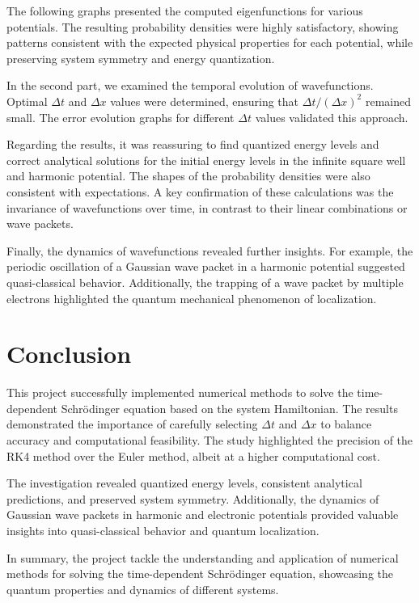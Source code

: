 \documentclass[12pt,french]{article}
\begin{document}
The following graphs presented the computed eigenfunctions for various potentials. The resulting probability densities were highly satisfactory, showing patterns consistent with the expected physical properties for each potential, while preserving system symmetry and energy quantization.

In the second part, we examined the temporal evolution of wavefunctions. Optimal \(\Delta t\) and \(\Delta x\) values were determined, ensuring that \(\Delta t / (\Delta x)^2\) remained small. The error evolution graphs for different \(\Delta t\) values validated this approach.


Regarding the results, it was reassuring to find quantized energy levels and correct analytical solutions for the initial energy levels in the infinite square well and harmonic potential. The shapes of the probability densities were also consistent with expectations. A key confirmation of these calculations was the invariance of wavefunctions over time, in contrast to their linear combinations or wave packets.

Finally, the dynamics of wavefunctions revealed further insights. For example, the periodic oscillation of a Gaussian wave packet in a harmonic potential suggested quasi-classical behavior. Additionally, the trapping of a wave packet by multiple electrons highlighted the quantum mechanical phenomenon of localization.

\section{Conclusion}

This project successfully implemented numerical methods to solve the time-dependent Schrödinger equation based on the system Hamiltonian. The results demonstrated the importance of carefully selecting \(\Delta t\) and \(\Delta x\) to balance accuracy and computational feasibility. The study highlighted the precision of the RK4 method over the Euler method, albeit at a higher computational cost.

The investigation revealed quantized energy levels, consistent analytical predictions, and preserved system symmetry. Additionally, the dynamics of Gaussian wave packets in harmonic and electronic potentials provided valuable insights into quasi-classical behavior and quantum localization.

In summary, the project tackle the understanding and application of numerical methods for solving the time-dependent Schrödinger equation, showcasing the quantum properties and dynamics of different systems.
\end{document}
